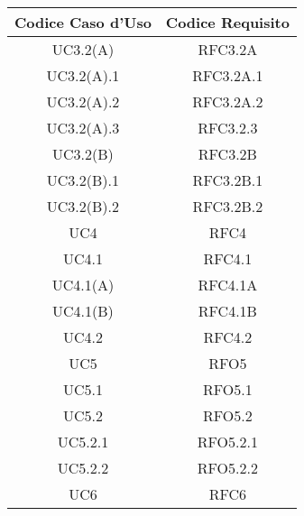         \begin{table}[!htbp] %
            \centering
            \renewcommand{\arraystretch}{2} %
                \begin{tabular}{|c|c|} %
                \rowcolor{orange!50} %
        		\hline
        		\textbf{Codice Caso d'Uso} & \textbf{Codice Requisito} \\
                \hline
                UC3.2(A)& RFC3.2A\\
                \hline
                UC3.2(A).1 & RFC3.2A.1\\
                \hline
                UC3.2(A).2 & RFC3.2A.2\\
                \hline
                UC3.2(A).3 & RFC3.2.3\\
                \hline
                UC3.2(B) & RFC3.2B\\
                \hline
                UC3.2(B).1 & RFC3.2B.1\\
                \hline
                UC3.2(B).2 & RFC3.2B.2\\
                \hline
                UC4 & RFC4\\
                \hline
                UC4.1 & RFC4.1\\
                \hline
                UC4.1(A) & RFC4.1A\\
                \hline
                UC4.1(B) & RFC4.1B\\
                \hline
                UC4.2 & RFC4.2\\
                \hline
                UC5 & RFO5\\
                \hline
                UC5.1 & RFO5.1\\
                \hline
                UC5.2 & RFO5.2\\
                \hline
                UC5.2.1 & RFO5.2.1\\
                \hline
                UC5.2.2 & RFO5.2.2\\
                \hline
                UC6 & RFC6\\
                \hline
                \end{tabular}
        \end{table}
